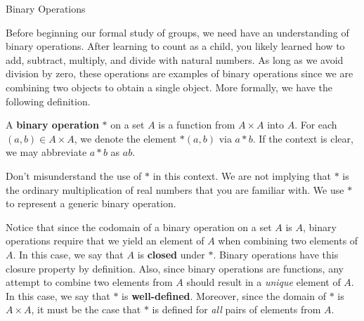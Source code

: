 \begin{section}{Binary Operations}


Before beginning our formal study of groups, we need have an understanding of binary operations. After learning to count as a child, you likely learned how to add, subtract, multiply, and divide with natural numbers.  As long as we avoid division by zero, these operations are examples of binary operations since we are combining two objects to obtain a single object.  More formally, we have the following definition.

\begin{definition}
A \textbf{binary operation} $*$ on a set $A$ is a function from $A\times A$ into $A$.  For each $(a,b)\in A\times A$, we denote the element $*(a,b)$ via $a*b$.  If the context is clear, we may abbreviate $a*b$ as $ab$.
\end{definition}

Don't misunderstand the use of $*$ in this context.  We are not implying that $*$ is the ordinary multiplication of real numbers that you are familiar with.  We use $*$ to represent a generic binary operation.  

Notice that since the codomain of a binary operation on a set $A$ is $A$, binary operations require that we yield an element of $A$ when combining two elements of $A$.  In this case, we say that $A$ is \textbf{closed} under $*$.  Binary operations have this closure property by definition.  Also, since binary operations are functions, any attempt to combine two elements from $A$ should result in a \emph{unique} element of $A$.  In this case, we say that $*$ is \textbf{well-defined}.  Moreover, since the domain of $*$ is $A\times A$, it must be the case that $*$ is defined for \emph{all} pairs of elements from $A$.


\end{section}
